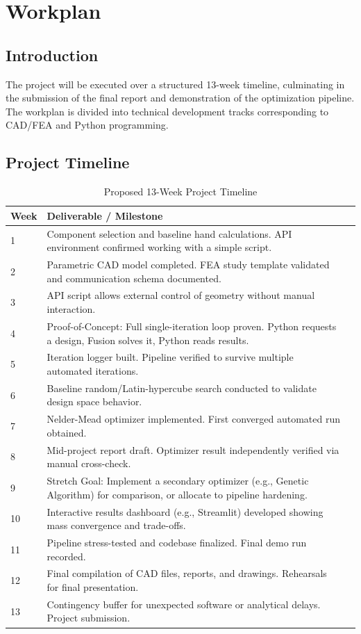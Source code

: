 \chapter{Workplan}
\label{chap:workplan}

\section{Introduction}
The project will be executed over a structured 13-week timeline, culminating in the submission of the final report and demonstration of the optimization pipeline. The workplan is divided into technical development tracks corresponding to CAD/FEA and Python programming.

\section{Project Timeline}

\begin{table}[H]
    \centering
    \caption{Proposed 13-Week Project Timeline}
    \label{tab:timeline}
    \begin{tabularx}{\textwidth}{lXX}
        \toprule
        \textbf{Week} & \textbf{Deliverable / Milestone} \\
        \midrule
        1 & Component selection and baseline hand calculations. API environment confirmed working with a simple script. \\
        2 & Parametric CAD model completed. FEA study template validated and communication schema documented. \\
        3 & API script allows external control of geometry without manual interaction. \\
        4 & Proof-of-Concept: Full single-iteration loop proven. Python requests a design, Fusion solves it, Python reads results. \\
        5 & Iteration logger built. Pipeline verified to survive multiple automated iterations. \\
        6 & Baseline random/Latin-hypercube search conducted to validate design space behavior. \\
        7 & Nelder-Mead optimizer implemented. First converged automated run obtained. \\
        8 & Mid-project report draft. Optimizer result independently verified via manual cross-check. \\
        9 & Stretch Goal: Implement a secondary optimizer (e.g., Genetic Algorithm) for comparison, or allocate to pipeline hardening. \\
        10 & Interactive results dashboard (e.g., Streamlit) developed showing mass convergence and trade-offs. \\
        11 & Pipeline stress-tested and codebase finalized. Final demo run recorded. \\
        12 & Final compilation of CAD files, reports, and drawings. Rehearsals for final presentation. \\
        13 & Contingency buffer for unexpected software or analytical delays. Project submission. \\
        \bottomrule
    \end{tabularx}
\end{table}
